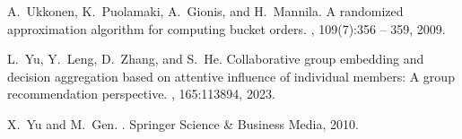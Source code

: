 \documentclass[preprint,12pt]{article}
\theoremstyle{definition}
\theoremstyle{remark}
\theoremstyle{example} %
\begin{document}
\begin{thebibliography}{10}
A.~Ukkonen, K.~Puolamaki, A.~Gionis, and H.~Mannila.
\newblock A randomized approximation algorithm for computing bucket orders.
, 109(7):356 -- 359, 2009.

L.~Yu, Y.~Leng, D.~Zhang, and S.~He.
\newblock Collaborative group embedding and decision aggregation based on attentive influence of individual members: A group recommendation perspective.
, 165:113894, 2023.

X.~Yu and M.~Gen.
.
\newblock Springer Science \& Business Media, 2010.

\end{thebibliography}
\end{document}

